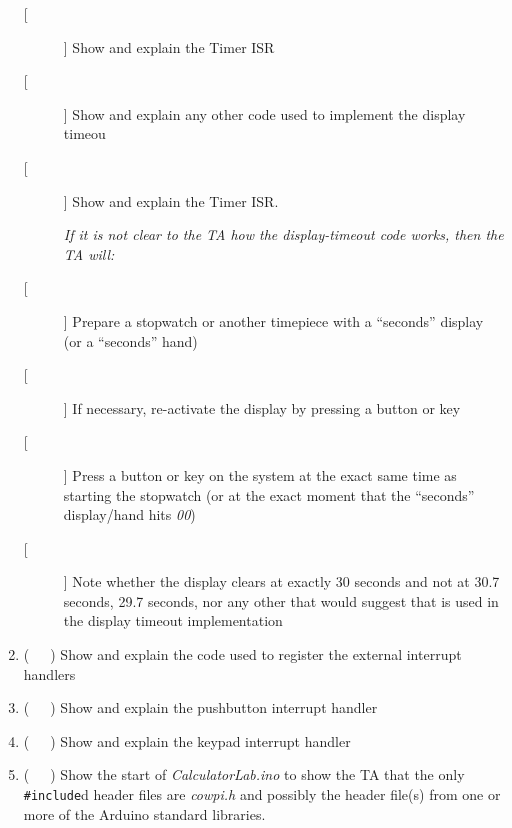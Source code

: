 \begin{enumerate}
\begin{description}
    \item [[ ]] Show and explain the Timer ISR
    \item [[ ]] Show and explain any other code used to implement the display
        timeou
    \item [[ ]] Show and explain the Timer ISR.
    \item [] \textit{If it is not clear to the TA how the display-timeout code
        works, then the TA will:}
    \item [[ ]] Prepare a stopwatch or another timepiece with a ``seconds''
        display (or a ``seconds'' hand)
    \item [[ ]] If necessary, re-activate the display by pressing a button or
        key
    \item [[ ]] Press a button or key on the system at the exact same time as
        starting the stopwatch (or at the exact moment that the ``seconds''
        display/hand hits \textit{00})
    \item [[ ]] Note whether the display clears at exactly 30 seconds and not
        at 30.7 seconds, 29.7 seconds, nor any other that would suggest that
         is used in the display timeout implementation
    \end{description}
\item (\ \ \ ) Show and explain the code used to register the external
    interrupt handlers
\item (\ \ \ ) Show and explain the pushbutton interrupt handler
\item (\ \ \ ) Show and explain the keypad interrupt handler
\item (\ \ \ ) Show the start of \textit{CalculatorLab.ino} to show the TA that the only \lstinline{#include}d header files are \textit{cowpi.h} and possibly the header file(s) from one or more of the Arduino standard libraries.
\end{enumerate}


